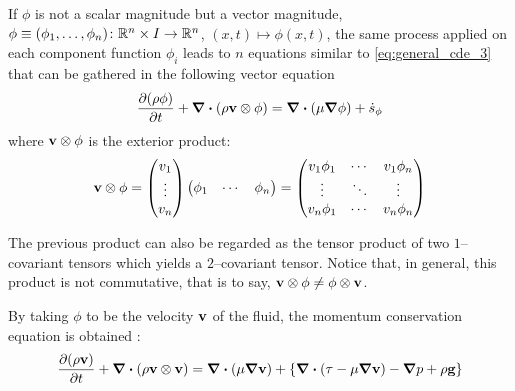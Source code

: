 If $\phi$ is not a scalar magnitude but a vector magnitude, \ie $\phi \equiv
(\phi_1, \ldots, \phi_n) \colon \mathbb{R}^n \times I \to \mathbb{R}^n$, $(x, t)
\mapsto \phi(x, t)$, the same process applied on each component function
$\phi_i$ leads to $n$ equations similar to \eqref{eq:general_cde_3} that can be
gathered in the following vector equation
\begin{equation*}
	\pdv{(\rho \phi)}{t} + \div(\rho \vb{v} \otimes \phi) = 
	\div(\mu \grad{\phi}) + \dot{s}_\phi
\end{equation*}
where $\vb{v} \otimes \phi$ is the exterior product:
\begin{equation*}
	\vb{v} \otimes \phi =	
	\begin{pmatrix}
		v_1 \\ \vdots \\ v_n
	\end{pmatrix}
	\begin{pmatrix}
		\phi_1 & \cdots & \phi_n
	\end{pmatrix} = 
	\begin{pmatrix}
		v_1 \phi_1  & \cdots & v_1 \phi_n \\
		\vdots & \ddots & \vdots \\
		v_n \phi_1  & \cdots & v_n \phi_n
	\end{pmatrix}
\end{equation*}

The previous product can also be regarded as the tensor product of two
$1$--covariant tensors which yields a $2$--covariant tensor. Notice that, in
general, this product is not commutative, that is to say, $\vb{v} \otimes \phi
\neq \phi \otimes \vb{v}$.

By taking $\phi$ to be the velocity $\vb{v}$ of the fluid, the momentum
conservation equation is obtained \cite{cttc_cde_2021}:
\begin{equation} \label{eq:cde_momentum_equation}
	\pdv{(\rho \vb{v})}{t} + \div(\rho \vb{v} \otimes \vb{v}) = 
	\div(\mu \grad{\vb{v}}) + \left\{ \div(\vb{\tau - \mu \grad{\vb{v}}}) - \grad{p} + \rho \vb{g} \right\}
\end{equation}



